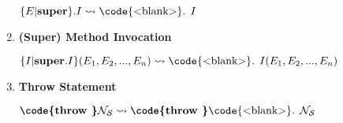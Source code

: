 \begin{enumerate}[label=\roman*.]


    $\{E\vert\text{\textbf{super}\}}.I \rightsquigarrow \text{\code{<blank>}. }I$
    \item \textbf{(Super) Method Invocation}


    
    $\{I\vert\text{\textbf{super}.}I\}(E_1, E_2, ..., E_n) \rightsquigarrow \text{\code{<blank>}. }I(E_1, E_2, ..., E_n)$
    \item \textbf{Throw Statement}

    
    $\text{\textbf{\code{throw }}}\mathcal{N}_{\mathcal{S}} \rightsquigarrow \text{\textbf{\code{throw }}\code{<blank>}. }\mathcal{N}_{\mathcal{S}}$
\end{enumerate}